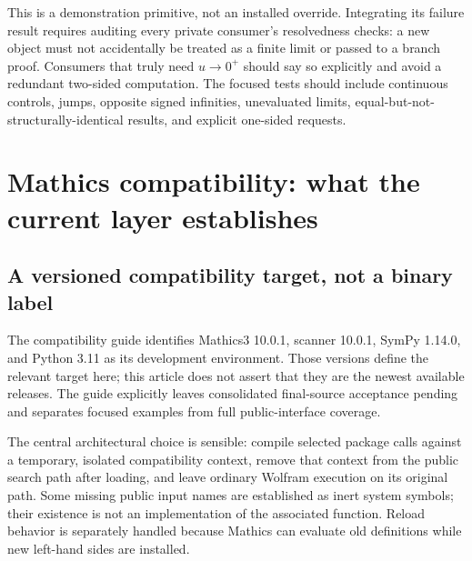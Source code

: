 \documentclass[11pt,a4paper]{article}
\newcommand{\code}[1]{\texttt{\detokenize{#1}}}
\begin{document}
This is a demonstration primitive, not an installed override. Integrating its
failure result requires auditing every private consumer's resolvedness checks:
a new \code{Failure} object must not accidentally be treated as a finite limit
or passed to a branch proof. Consumers that truly need $u\to0^+$ should say so
explicitly and avoid a redundant two-sided computation. The focused tests
should include continuous controls, jumps, opposite signed infinities,
unevaluated limits, equal-but-not-structurally-identical results, and explicit
one-sided requests.

\section{Mathics compatibility: what the current layer establishes}
\label{sec:mathics}

\subsection{A versioned compatibility target, not a binary label}

The compatibility guide identifies Mathics3 10.0.1, scanner 10.0.1, SymPy 1.14.0,
and Python 3.11 as its development environment. Those versions define the
relevant target here; this article does not assert that they are the newest
available releases. The guide explicitly leaves consolidated final-source
acceptance pending and separates focused examples from full public-interface
coverage. \cite{mathicsguide}

The central architectural choice is sensible: compile selected package calls
against a temporary, isolated compatibility context, remove that context from
the public search path after loading, and leave ordinary Wolfram execution on
its original path. Some missing public input names are established as inert
system symbols; their existence is not an implementation of the associated
function. Reload behavior is separately handled because Mathics can evaluate
old definitions while new left-hand sides are installed.
\cite{mathicscompat,modulemap,core}
\end{document}
